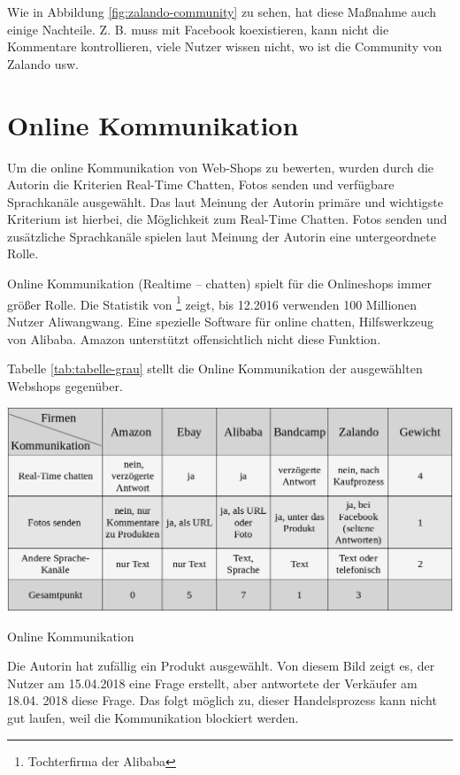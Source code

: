 Wie in Abbildung \vref{fig:zalando-community} zu sehen, hat diese Maßnahme auch einige Nachteile. Z. B. muss mit Facebook koexistieren, kann nicht die Kommentare kontrollieren, viele Nutzer wissen nicht, wo ist die Community von Zalando usw.


\section{Online Kommunikation}

Um die online Kommunikation von Web-Shops zu bewerten, wurden durch die Autorin die Kriterien Real-Time Chatten, Fotos senden und verfügbare Sprachkanäle ausgewählt. Das laut Meinung der Autorin primäre und wichtigste Kriterium ist hierbei, die Möglichkeit zum Real-Time Chatten. Fotos senden und zusätzliche Sprachkanäle spielen laut Meinung der Autorin eine untergeordnete Rolle.

Online Kommunikation (Realtime – chatten) spielt für die Onlineshops immer größer Rolle. Die Statistik von \textcite{aliyun}\footnote{Tochterfirma der Alibaba} zeigt, bis 12.2016 verwenden 100 Millionen Nutzer Aliwangwang. Eine spezielle Software für online chatten, Hilfswerkzeug von Alibaba. Amazon unterstützt offensichtlich nicht diese Funktion.

Tabelle \vref{tab:tabelle-grau} stellt die Online Kommunikation der ausgewählten Webshops gegenüber.

\begin{table}[htbp]
	\centering
	\includegraphics[width=1\textwidth]{bilder/tabelle-grau.png}
	\caption{Online Kommunikation}
	\label{tab:tabelle-grau}
\end{table}

Die Autorin hat zufällig ein Produkt ausgewählt. Von diesem Bild zeigt es, der Nutzer am 15.04.2018 eine Frage erstellt, aber antwortete der Verkäufer am 18.04. 2018 diese Frage. Das folgt möglich zu, dieser Handelsprozess kann nicht gut laufen, weil die Kommunikation blockiert werden.

